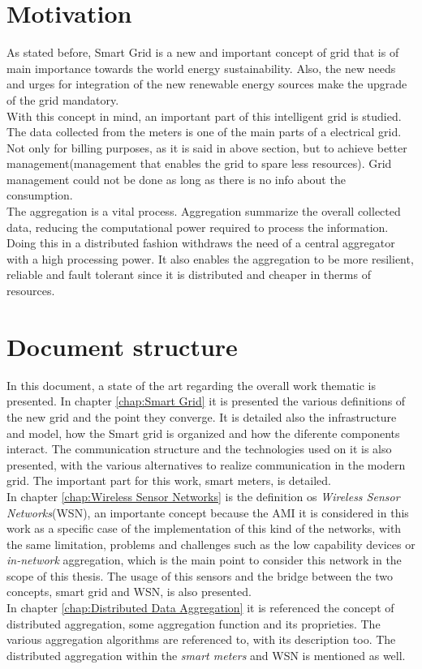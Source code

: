 \section{Motivation}
As stated before, Smart Grid is a new and important concept of grid that is of main importance towards the world energy sustainability. Also, the new needs and urges for integration of the new renewable energy sources make the upgrade of the grid mandatory.\\
With this concept in mind, an important part of this intelligent grid is studied. The data collected from the meters is one of the main parts of a electrical grid. Not only for billing purposes, as it is said in above section, but to achieve better management(management that enables the grid to spare less resources). Grid management could not be done as long as there is no info about the consumption.\\
The aggregation is a vital process. Aggregation summarize the overall collected data, reducing the computational power required to process the information. Doing this in a distributed fashion withdraws the need of a central aggregator with a high processing power. It also enables the aggregation to be more resilient, reliable and fault tolerant since it is distributed and  cheaper in therms of resources.


\section{Document structure}\label{s:struct}
In this document, a state of the art regarding the overall work thematic is presented. In chapter \ref{chap:Smart Grid} it is presented the various definitions of the new grid and the point they converge. It is detailed also the infrastructure and model, how the Smart grid is organized and how the diferente components interact.  The communication structure and the technologies used on it is also presented, with the various alternatives to realize communication in the modern grid. The important part for this work, smart meters, is detailed.\\
In chapter \ref{chap:Wireless Sensor Networks} is the definition os \textit{Wireless Sensor Networks}(WSN), an importante concept because the AMI it is considered in this work as a specific case of the implementation of this kind of the networks, with the same limitation, problems and challenges such as the low capability devices or \textit{in-network} aggregation, which is the main point to consider this network in the scope of this thesis. The usage of this sensors and the bridge between the two concepts, smart grid and WSN, is also presented.\\
In chapter \ref{chap:Distributed Data Aggregation} it is referenced the concept of distributed aggregation, some aggregation function and its proprieties.  The various aggregation algorithms are referenced to, with its description too. The distributed aggregation within  the \textit{smart meters} and WSN is mentioned as well.

